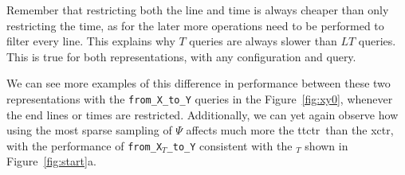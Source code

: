    Remember that restricting both the line and time is always cheaper than only restricting the time, as for the later more operations need to be performed to filter every line. This explains why $T$ queries are always slower than $LT$ queries. This is true for both representations, with any configuration and query.
    
    We can see more examples of this difference in performance between these two representations with the \texttt{from\_X\_to\_Y} queries in the Figure~\ref{fig:xy0}, whenever the end lines or times are restricted. Additionally, we can yet again observe how using the most sparse sampling of $\Psi$ affects much more the \gls{ttctr}~than the \gls{xctr}, with the performance of \texttt{from\_X$_{T}$\_to\_Y} consistent with the \texttt{\startX$_T$} shown in Figure~\ref{fig:start}a.
    
